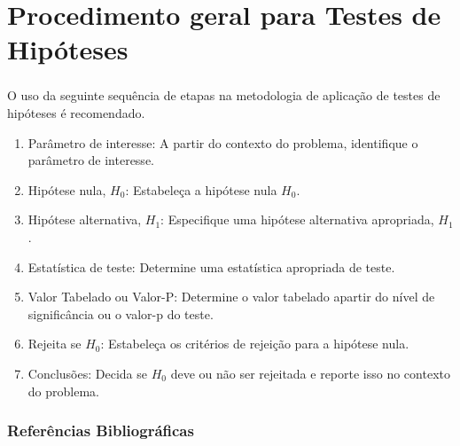 \documentclass[14pt,aspectratio=1610]{beamer}
\newcommand{\Ho}{\ensuremath{H_{0}}}
\newcommand{\Hi}{\ensuremath{H_{1}}}
\begin{document}
\section{Procedimento geral para Testes de Hipóteses}
\begin{frame}{}
\frametitle{}
\begin{block}{}
\justifying
O uso da seguinte sequência de etapas na metodologia de aplicação de testes de hipóteses é recomendado.
\begin{enumerate}
\item Parâmetro de interesse: A partir do contexto do problema, identifique o parâmetro de interesse.\pause
\item Hipótese nula, $\Ho$: Estabeleça a hipótese nula $\Ho$. \pause
\item Hipótese alternativa, $\Hi$: Especifique uma hipótese alternativa apropriada, $\Hi$.\pause
\item Estatística de teste: Determine uma estatística apropriada de teste.\pause
\item Valor Tabelado ou Valor-P: Determine o valor tabelado apartir do nível de significância ou o valor-p do teste.\pause
\item Rejeita se $\Ho$: Estabeleça os critérios de rejeição para a hipótese nula.\pause
\item Conclusões: Decida se $\Ho$ deve ou não ser rejeitada e reporte isso no contexto do problema.
\end{enumerate}
\end{block}
\end{frame}

\begin{frame}{}
\frametitle{Referências Bibliográficas}

\end{frame}
\end{document}
